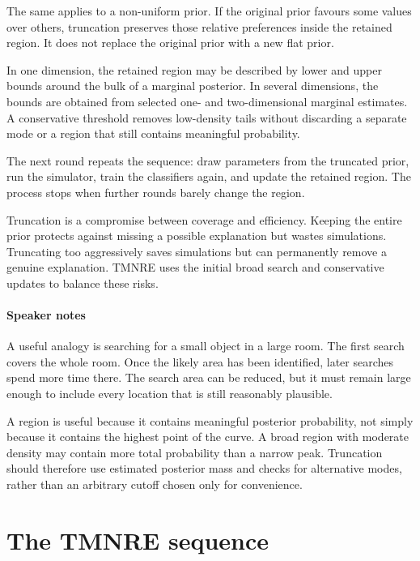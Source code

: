 ﻿\documentclass[13pt,a4paper]{article}
\begin{document}
The same applies to a non-uniform prior. If the original prior favours some values over others, truncation preserves those relative preferences inside the retained region. It does not replace the original prior with a new flat prior.

In one dimension, the retained region may be described by lower and upper bounds around the bulk of a marginal posterior. In several dimensions, the bounds are obtained from selected one- and two-dimensional marginal estimates. A conservative threshold removes low-density tails without discarding a separate mode or a region that still contains meaningful probability.

The next round repeats the sequence: draw parameters from the truncated prior, run the simulator, train the classifiers again, and update the retained region. The process stops when further rounds barely change the region.

Truncation is a compromise between coverage and efficiency. Keeping the entire prior protects against missing a possible explanation but wastes simulations. Truncating too aggressively saves simulations but can permanently remove a genuine explanation. TMNRE uses the initial broad search and conservative updates to balance these risks.

\paragraph{Speaker notes}

A useful analogy is searching for a small object in a large room. The first search covers the whole room. Once the likely area has been identified, later searches spend more time there. The search area can be reduced, but it must remain large enough to include every location that is still reasonably plausible.

A region is useful because it contains meaningful posterior probability, not simply because it contains the highest point of the curve. A broad region with moderate density may contain more total probability than a narrow peak. Truncation should therefore use estimated posterior mass and checks for alternative modes, rather than an arbitrary cutoff chosen only for convenience.\section*{The TMNRE sequence}
\end{document}
